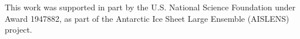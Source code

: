 This work was supported in part by the U.S. National Science Foundation under Award 1947882, as part of the Antarctic Ice Sheet Large Ensemble (AISLENS) project.